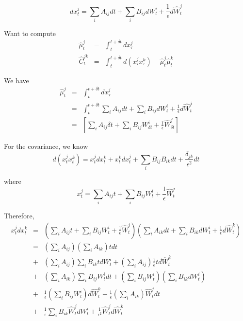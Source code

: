 \documentclass[12pt]{article}
\begin{document}
\begin{equation}
dx_t^j = \sum_i A_{ij} dt + \sum_i B_{ij} dW_t^i + \frac{1}{\epsilon} d\hat{W}_t^j
\end{equation}

Want to compute
\begin{eqnarray}
\hat{\mu}_t^j &=& \int_{t}^{t+\delta t} dx_{\tau}^j \\
\hat{C}_t^{jk} &=& \int_{t}^{t+\delta t} d(x_{\tau}^j x_{\tau}^k) - \hat{\mu}_t^j \hat{\mu}_t^k
\end{eqnarray}

We have
\begin{eqnarray}
\hat{\mu}_t^j &=& \int_{t}^{t+\delta t} dx_{\tau}^j \\
&=& \int_{t}^{t+\delta t} \sum_i A_{ij} dt + \sum_i B_{ij} dW_t^i + \frac{1}{\epsilon} d\hat{W}_t^j \\
&=& \left[ \sum_i A_{ij} \delta t + \sum_i B_{ij} W_{\delta t}^i + \frac{1}{\epsilon} \hat{W}_{\delta t}^j \right]
\end{eqnarray}

For the covariance, we know
\begin{equation}
d(x_t^j x_t^k) = x_t^j dx_t^k + x_t^k dx_t^j + \sum_i B_{ij} B_{ik} dt + \frac{\delta_{jk}}{\epsilon^2} dt
\end{equation}

where
\begin{equation}
x_t^j = \sum_i A_{ij} t + \sum_i B_{ij} W_t^i + \frac{1}{\epsilon} \hat{W}_t^j
\end{equation}

Therefore, 
\begin{eqnarray}
x_t^j dx_t^k &=& 
\left( \sum_i A_{ij} t 
+ \sum_i B_{ij} W_t^i 
+ \frac{1}{\epsilon} \hat{W}_t^j \right) \left( \sum_i A_{ik} dt 
+ \sum_i B_{ik} dW_t^i + \frac{1}{\epsilon} d\hat{W}_t^k \right) \\
&=& \left( \sum_i A_{ij} \right) \left( \sum_i A_{ik} \right) t dt \\
&+& \left( \sum_i A_{ij} \right) \sum_i B_{ik} t dW_t^i 
+ \left( \sum_i A_{ij} \right) \frac{1}{\epsilon} t d\hat{W}_t^k \\
&+& \left( \sum_i A_{ik} \right) \sum_i B_{ij} W_t^i dt 
+ \left( \sum_i B_{ij} W_t^i \right) \left( \sum_i B_{ik} dW_t^i \right) \\
&+& \frac{1}{\epsilon} \left(\sum_i B_{ij} W_t^i \right) d\hat{W}_t^k 
+ \frac{1}{\epsilon} \left(\sum_i A_{ik} \right) \hat{W}_t^j dt \\
&+& \frac{1}{\epsilon}\sum_i B_{ik} \hat{W}_t^j dW_t^i 
+ \frac{1}{\epsilon^2} \hat{W}_t^j d\hat{W}_t^k
\end{eqnarray}
\end{document}
